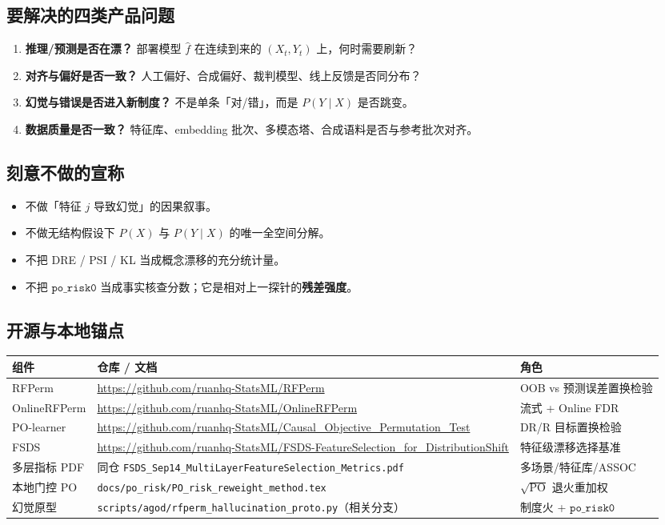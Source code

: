 \documentclass[11pt,a4paper,UTF8,fontset=none]{ctexart}
\begin{document}
\subsection{要解决的四类产品问题}
\begin{enumerate}
  \item \textbf{推理/预测是否在漂？} 部署模型 \(\hat f\) 在连续到来的 \((X_t,Y_t)\) 上，何时需要刷新？
  \item \textbf{对齐与偏好是否一致？} 人工偏好、合成偏好、裁判模型、线上反馈是否同分布？
  \item \textbf{幻觉与错误是否进入新制度？} 不是单条「对/错」，而是 \(P(Y\mid X)\) 是否跳变。
  \item \textbf{数据质量是否一致？} 特征库、embedding 批次、多模态塔、合成语料是否与参考批次对齐。
\end{enumerate}

\subsection{刻意不做的宣称}
\begin{itemize}
  \item 不做「特征 \(j\) 导致幻觉」的因果叙事。
  \item 不做无结构假设下 \(P(X)\) 与 \(P(Y\mid X)\) 的唯一全空间分解。
  \item 不把 DRE / PSI / KL 当成概念漂移的充分统计量。
  \item 不把 \(\texttt{po\_risk0}\) 当成事实核查分数；它是相对上一探针的\textbf{残差强度}。
\end{itemize}

\subsection{开源与本地锚点}
\begin{center}
\begin{tabular}{@{}llp{7.2cm}@{}}
\toprule
组件 & 仓库 / 文档 & 角色 \\
\midrule
RFPerm & \url{https://github.com/ruanhq-StatsML/RFPerm} & OOB vs 预测误差置换检验 \\
OnlineRFPerm & \url{https://github.com/ruanhq-StatsML/OnlineRFPerm} & 流式 + Online FDR \\
PO-learner & \url{https://github.com/ruanhq-StatsML/Causal_Objective_Permutation_Test} & DR/R 目标置换检验 \\
FSDS & \url{https://github.com/ruanhq-StatsML/FSDS-FeatureSelection_for_DistributionShift} & 特征级漂移选择基准 \\
多层指标 PDF & 同仓 \texttt{FSDS\_Sep14\_MultiLayerFeatureSelection\_Metrics.pdf} & 多场景/特征库/ASSOC \\
本地门控 PO & \texttt{docs/po\_risk/PO\_risk\_reweight\_method.tex} & \(\sqrt{\mathrm{PO}}\) 退火重加权 \\
幻觉原型 & \texttt{scripts/agod/rfperm\_hallucination\_proto.py}（相关分支） & 制度火 + \(\texttt{po\_risk0}\) \\
\bottomrule
\end{tabular}
\end{center}
\end{document}
